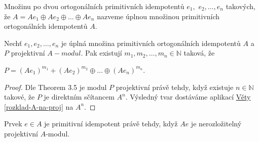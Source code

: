      \begin{dfn}
       Množinu po dvou ortogonálních primitivních idempotentů $e_1,$ $e_2,\ldots,e_n$ 
       takových, že $A=Ae_1\oplus Ae_2\oplus\ldots\oplus Ae_n$ nazveme úplnou 
       množinou primitivních ortogonálních idempotentů $A$.
     \end{dfn}
                       
     \begin{thm}\label{rozklad-proj}
       Nechť $e_1,e_2,\ldots,e_n$ je úplná množina primitivních ortogonálních idempotentů $A$ 
       a $P$ projektivní $A-modul$. Pak existují $m_1,m_2,\ldots,m_n\in\mathbb N$ taková, že\\
       \centerline{$P=(Ae_1)^{m_1}\plus (Ae_2)^{m_2}\oplus\ldots\oplus (Ae_n)^{m_n}$.}       
     \end{thm}
     \begin{proof}
       Dle \cite{5} Theorem 3.5 je modul $P$ projektivní právě tehdy, když existuje $n\in\mathbb 
       N$ takové, že $P$ je direktním sčítancem $A^n$. Výsledný tvar dostáváme 
       aplikací \hyperref[rozklad-A-na-proj]{Věty \ref*{rozklad-A-na-proj}} na $A^n$.
     \end{proof}
     
    \begin{dsl}\label{Ae-projektivni}
       Prvek $e\in A$ je primitivní idempotent právě tehdy, když $Ae$ je 
       nerozložitelný projektivní $A$-modul.
     \end{dsl} 
     
